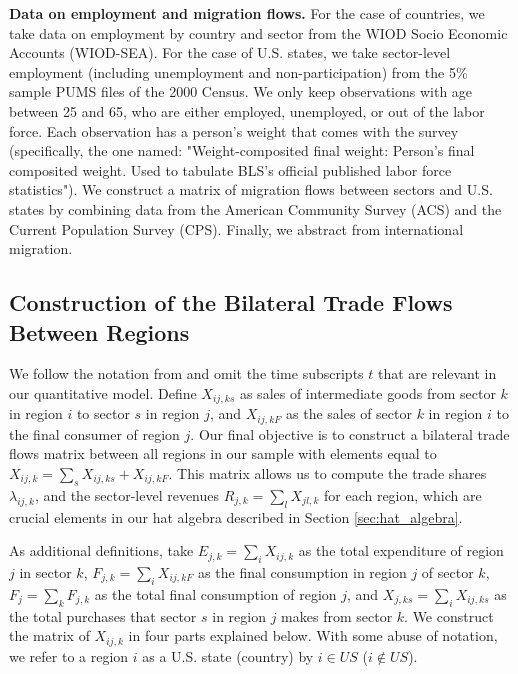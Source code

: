 \documentclass[12pt]{article}
\begin{document}
\textbf{Data on employment and migration flows.} For the case of countries, we take data on employment by country and sector from the WIOD Socio Economic Accounts (WIOD-SEA). For the case of U.S. states, we take sector-level employment (including unemployment and non-participation) from the 5\% sample PUMS files of the 2000 Census. We only keep observations with age between 25 and 65, who are either employed, unemployed, or out of the labor force. Each observation has a person's weight that comes with the survey (specifically, the one named: "Weight-composited final weight: Person's final composited weight. Used to tabulate BLS's official published labor force statistics"). We construct a matrix of migration flows between sectors and U.S. states by combining data from the American Community Survey (ACS) and the Current Population Survey (CPS). Finally, we abstract from international migration.

\subsection{Construction of the Bilateral Trade Flows Between Regions} \label{sec:appendix_data_bilat}

We follow the notation from \cite{Costinot2014} and omit the time subscripts $t$ that are relevant in our quantitative model. Define  $X_{ij,ks}$ as sales of intermediate goods from sector $k$ in region $i$ to sector $s$ in region $j$, and $X_{ij,kF}$ as the sales of sector $k$ in region $i$ to the final consumer of region $j$. Our final objective is to construct a bilateral trade flows matrix between all regions in our sample with elements equal to $X_{ij,k}=\sum_{s}X_{ij,ks}+X_{ij,kF}$. This matrix allows us to compute the trade shares $\lambda_{ij,k}$, and the sector-level revenues $R_{j,k}=\sum_{l}X_{jl,k}$ for each region, which are crucial elements in our hat algebra described in Section \ref{sec:hat_algebra}. 

As additional definitions, take $E_{j,k}=\sum_{i}X_{ij,k}$ as the total expenditure of region $j$ in sector $k$,  $F_{j,k}=\sum_{i}X_{ij,kF}$ as the final consumption in region $j$ of sector $k$, $F_{j}=\sum_{k}F_{j,k}$ as the total final consumption of region $j$, and $X_{j,ks}=\sum_{i}X_{ij,ks}$ as the total purchases that sector $s$ in region $j$ makes from sector $k$. We construct the matrix of $X_{ij,k}$ in four parts explained below. With some abuse of notation, we refer to a region $i$ as a U.S. state (country) by $i \in US$ ($i \notin US$). 
\end{document}
